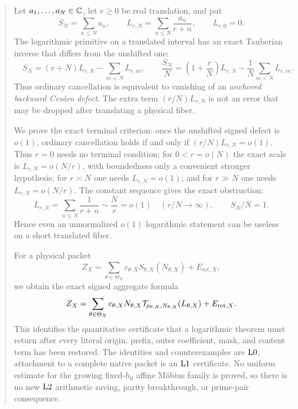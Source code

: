 \begin{abstract}
Let \(a_1,\ldots,a_N\in\C\), let \(r\ge0\) be real
translation, and put
\[
 S_N=\sum_{n\le N}a_n,\qquad
 L_{r,N}=\sum_{n\le N}\frac{a_n}{r+n},\qquad L_{r,0}=0.
\]
The logarithmic primitive on a translated interval has an exact
Tauberian inverse that differs from the unshifted one:
\[
 \boxed{\quad
 S_N=(r+N)L_{r,N}-\sum_{m<N}L_{r,m},\qquad
 \frac{S_N}{N}
 =
 \left(1+\frac rN\right)L_{r,N}
 -\frac1N\sum_{m<N}L_{r,m}.
 \quad}
\]
Thus ordinary cancellation is equivalent to vanishing of an
\emph{anchored backward Ces\`aro defect}.  The extra term
\((r/N)L_{r,N}\) is not an error that may be dropped after translating
a physical fiber.

We prove the exact terminal criterion: once the unshifted signed
defect is \(o(1)\), ordinary cancellation holds if and only if
\((r/N)L_{r,N}=o(1)\).  Thus \(r=0\) needs no terminal condition;
for \(0<r=o(N)\) the exact scale is \(L_{r,N}=o(N/r)\), with
boundedness only a convenient stronger hypothesis; for
\(r\asymp N\) one needs \(L_{r,N}=o(1)\); and for \(r\gg N\) one
needs \(L_{r,N}=o(N/r)\).
The constant sequence gives the exact obstruction:
\[
 L_{r,N}=\sum_{n\le N}\frac1{r+n}\sim\frac Nr=o(1)
 \quad(r/N\to\infty),
 \qquad S_N/N=1.
\]
Hence even an unnormalized \(o(1)\) logarithmic statement can be
useless on a short translated fiber.

For a physical packet
\[
 Z_X=\sum_{\theta\in\Theta_X}
 c_{\theta,X}S_{\theta,X}(N_{\theta,X})
 +E_{\mathrm{ret},X},
\]
we obtain the exact signed aggregate formula
\[
 Z_X=\sum_{\theta\in\Theta_X}
 c_{\theta,X}N_{\theta,X}
 \cT_{\rho_{\theta,X},N_{\theta,X}}(L_{\theta,X})
 +E_{\mathrm{ret},X}.
\]
This identifies the quantitative certificate that a logarithmic
theorem must return after every literal origin, prefix, outer
coefficient, mask, and content term has been restored.  The identities
and counterexamples are \(\Lzero\); attachment to a complete native
packet is an \(\Lone\) certificate.  No uniform estimate for the
growing fixed-\(h_0\) affine M\"obius family is proved, so there is no
new \(\Ltwo\) arithmetic saving, parity breakthrough, or prime-pair
consequence.
\end{abstract}
